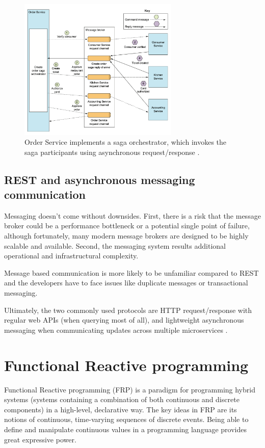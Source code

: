 \documentclass[conference]{IEEEtran}
\begin{document}
\begin{figure}[!htbp]
\centering
\includegraphics[width=3in]{jpeg/orchestrator-saga}
\caption{Order Service implements a saga orchestrator, which invokes the saga participants using asynchronous request/response \cite{microservices-patterns-saga}.}
\label{orchestrator_saga}
\end{figure}

\subsection{REST and asynchronous messaging communication}

Messaging doesn't come without downsides. First, there is a risk that the message broker could be a performance bottleneck or a potential single point of failure, although fortunately, many modern message brokers are designed to be highly scalable and available.
Second, the messaging system results additional operational and infrastructural complexity. 

Message based communication is more likely to be unfamiliar compared to REST and the developers have to face issues like duplicate messages or transactional messaging.

Ultimately, the two commonly used protocols are HTTP request/response with regular web APIs  (when querying most of all), and lightweight asynchronous messaging when communicating updates across multiple microservices \cite{communication}.

\section{Functional Reactive programming}

Functional Reactive programming (FRP) \cite{frp} is a paradigm for programming hybrid systems (systems containing a combination of both continuous and discrete components) in a high-level, declarative way. The key ideas in FRP are its notions of continuous, time-varying sequences of discrete events. Being able to define and manipulate continuous values in a programming language provides great expressive power.
\end{document}
